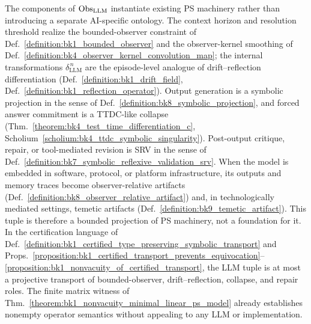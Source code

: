\begin{remark}
\label{remark:appD_llm_tuple_anchors}
The components of $\mathrm{Obs}_{\mathrm{LLM}}$ instantiate existing PS machinery rather
than introducing a separate AI-specific ontology. The context horizon and
resolution threshold realize the bounded-observer constraint of
Def.~\ref{definition:bk1_bounded_observer} and the observer-kernel smoothing of
Def.~\ref{definition:bk4_observer_kernel_convolution_map}; the internal
transformations $\delta_{\mathrm{LLM}}^{\,n}$ are the episode-level analogue of
drift--reflection differentiation (Def.~\ref{definition:bk1_drift_field},
Def.~\ref{definition:bk1_reflection_operator}). Output generation is a symbolic
projection in the sense of Def.~\ref{definition:bk8_symbolic_projection}, and
forced answer commitment is a TTDC-like collapse
(Thm.~\ref{theorem:bk4_test_time_differentiation_c},
Scholium~\ref{scholium:bk4_ttdc_symbolic_singularity}). Post-output critique,
repair, or tool-mediated revision is SRV in the sense of
Def.~\ref{definition:bk7_symbolic_reflexive_validation_srv}. When the model is
embedded in software, protocol, or platform infrastructure, its outputs and
memory traces become observer-relative artifacts
(Def.~\ref{definition:bk8_observer_relative_artifact}) and, in technologically
mediated settings, temetic artifacts (Def.~\ref{definition:bk9_temetic_artifact}).
This tuple is therefore a bounded projection of PS machinery, not a foundation
for it.  In the certification language of
Def.~\ref{definition:bk1_certified_type_preserving_symbolic_transport} and
Props.~\ref{proposition:bk1_certified_transport_prevents_equivocation}--\ref{proposition:bk1_nonvacuity_of_certified_transport}, the LLM tuple
is at most a projective transport of bounded-observer,
drift--reflection, collapse, and repair roles.  The finite matrix witness of
Thm.~\ref{theorem:bk1_nonvacuity_minimal_linear_ps_model} already establishes
nonempty operator semantics without appealing to any LLM or implementation.
\end{remark}
